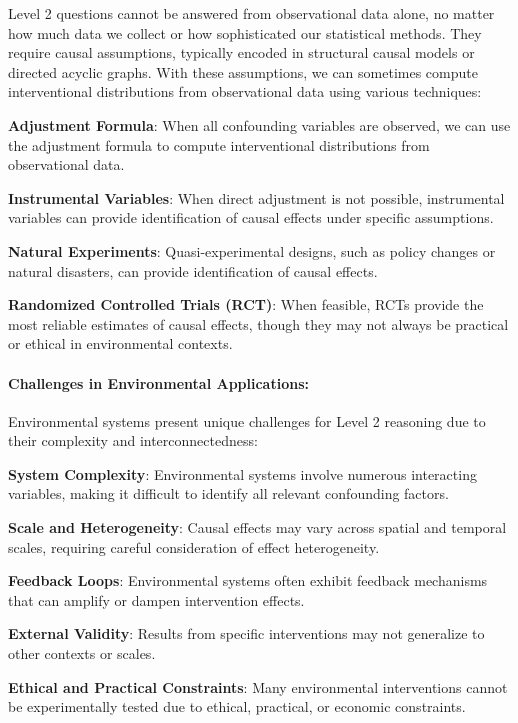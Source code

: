 Level 2 questions cannot be answered from observational data alone, no matter how much data we collect or how sophisticated our statistical methods. They require causal assumptions, typically encoded in structural causal models or directed acyclic graphs. With these assumptions, we can sometimes compute interventional distributions from observational data using various techniques:

\textbf{Adjustment Formula}: When all confounding variables are observed, we can use the adjustment formula to compute interventional distributions from observational data.

\textbf{Instrumental Variables}: When direct adjustment is not possible, instrumental variables can provide identification of causal effects under specific assumptions.

\textbf{Natural Experiments}: Quasi-experimental designs, such as policy changes or natural disasters, can provide identification of causal effects.

\textbf{Randomized Controlled Trials (RCT)}: When feasible, RCTs provide the most reliable estimates of causal effects, though they may not always be practical or ethical in environmental contexts.

\paragraph{Challenges in Environmental Applications:}

Environmental systems present unique challenges for Level 2 reasoning due to their complexity and interconnectedness:

\textbf{System Complexity}: Environmental systems involve numerous interacting variables, making it difficult to identify all relevant confounding factors.

\textbf{Scale and Heterogeneity}: Causal effects may vary across spatial and temporal scales, requiring careful consideration of effect heterogeneity.

\textbf{Feedback Loops}: Environmental systems often exhibit feedback mechanisms that can amplify or dampen intervention effects.

\textbf{External Validity}: Results from specific interventions may not generalize to other contexts or scales.

\textbf{Ethical and Practical Constraints}: Many environmental interventions cannot be experimentally tested due to ethical, practical, or economic constraints.


